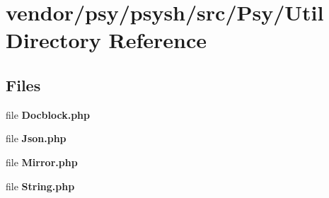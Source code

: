 \section{vendor/psy/psysh/src/\+Psy/\+Util Directory Reference}
\label{dir_5df48414aa9ea3abef8a377e876d0d92}
\subsection*{Files}
\begin{DoxyCompactItemize}
\item 
file {\bf Docblock.\+php}
\item 
file {\bf Json.\+php}
\item 
file {\bf Mirror.\+php}
\item 
file {\bf String.\+php}
\end{DoxyCompactItemize}
